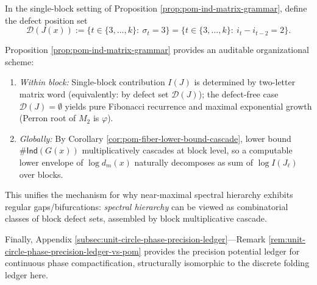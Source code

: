 \begin{definition}\label{def:pom-ind-defect-set}
In the single-block setting of Proposition \ref{prop:pom-ind-matrix-grammar}, define the defect position set
\[
\mathcal D(J(x)):=\{t\in\{3,\dots,k\}:\ \sigma_t=3\}
=\{t\in\{3,\dots,k\}:\ i_t-i_{t-2}=2\}.
\]
\end{definition}
\begin{remark}\label{rem:pom-ind-defect-class}
Proposition \ref{prop:pom-ind-matrix-grammar} provides an auditable organizational scheme:
\begin{enumerate}
  \item \emph{Within block:} Single-block contribution $I(J)$ is determined by two-letter matrix word (equivalently: by defect set $\mathcal D(J)$); the defect-free case $\mathcal D(J)=\emptyset$ yields pure Fibonacci recurrence and maximal exponential growth (Perron root of $M_2$ is $\varphi$).
  \item \emph{Globally:} By Corollary \ref{cor:pom-fiber-lower-bound-cascade}, lower bound $\#\mathsf{Ind}(G(x))$ multiplicatively cascades at block level, so a computable lower envelope of $\log d_m(x)$ naturally decomposes as sum of $\log I(J_\ell)$ over blocks.
\end{enumerate}
This unifies the mechanism for why near-maximal spectral hierarchy exhibits regular gaps/bifurcations: \emph{spectral hierarchy} can be viewed as combinatorial classes of block defect sets, assembled by block multiplicative cascade.
\end{remark}
Finally, Appendix \ref{subsec:unit-circle-phase-precision-ledger}—Remark \ref{rem:unit-circle-phase-precision-ledger-vs-pom} provides the precision potential ledger for continuous phase compactification, structurally isomorphic to the discrete folding ledger here.


